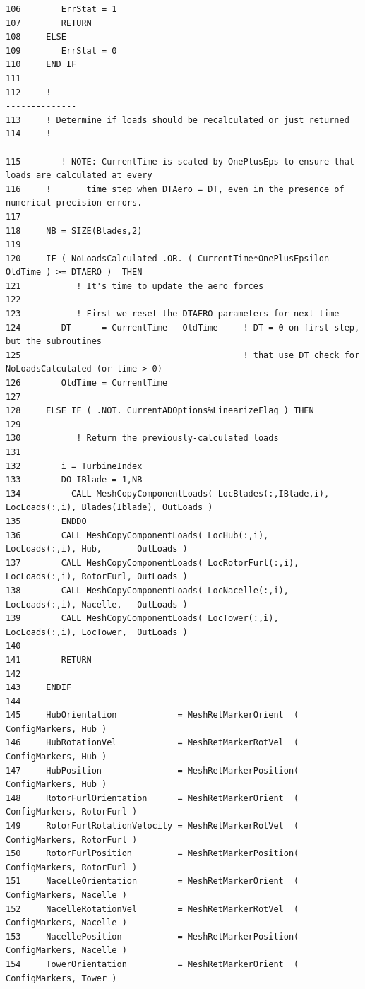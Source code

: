 \documentclass[11pt]{article}
\begin{document}
{\begin{verbatim}
106        ErrStat = 1
107        RETURN
108     ELSE
109        ErrStat = 0
110     END IF
111  
112     !---------------------------------------------------------------------------
113     ! Determine if loads should be recalculated or just returned
114     !---------------------------------------------------------------------------
115        ! NOTE: CurrentTime is scaled by OnePlusEps to ensure that loads are calculated at every
116     !       time step when DTAero = DT, even in the presence of numerical precision errors.
117  
118     NB = SIZE(Blades,2)
119  
120     IF ( NoLoadsCalculated .OR. ( CurrentTime*OnePlusEpsilon - OldTime ) >= DTAERO )  THEN
121           ! It's time to update the aero forces
122  
123           ! First we reset the DTAERO parameters for next time
124        DT      = CurrentTime - OldTime     ! DT = 0 on first step, but the subroutines 
125                                            ! that use DT check for NoLoadsCalculated (or time > 0)
126        OldTime = CurrentTime
127  
128     ELSE IF ( .NOT. CurrentADOptions%LinearizeFlag ) THEN
129  
130           ! Return the previously-calculated loads
131       
132        i = TurbineIndex
133        DO IBlade = 1,NB
134          CALL MeshCopyComponentLoads( LocBlades(:,IBlade,i), LocLoads(:,i), Blades(Iblade), OutLoads )
135        ENDDO
136        CALL MeshCopyComponentLoads( LocHub(:,i),       LocLoads(:,i), Hub,       OutLoads )
137        CALL MeshCopyComponentLoads( LocRotorFurl(:,i), LocLoads(:,i), RotorFurl, OutLoads )
138        CALL MeshCopyComponentLoads( LocNacelle(:,i),   LocLoads(:,i), Nacelle,   OutLoads )
139        CALL MeshCopyComponentLoads( LocTower(:,i),     LocLoads(:,i), LocTower,  OutLoads )
140  
141        RETURN
142  
143     ENDIF
144  
145     HubOrientation            = MeshRetMarkerOrient  ( ConfigMarkers, Hub )
146     HubRotationVel            = MeshRetMarkerRotVel  ( ConfigMarkers, Hub )
147     HubPosition               = MeshRetMarkerPosition( ConfigMarkers, Hub )
148     RotorFurlOrientation      = MeshRetMarkerOrient  ( ConfigMarkers, RotorFurl )
149     RotorFurlRotationVelocity = MeshRetMarkerRotVel  ( ConfigMarkers, RotorFurl )
150     RotorFurlPosition         = MeshRetMarkerPosition( ConfigMarkers, RotorFurl )
151     NacelleOrientation        = MeshRetMarkerOrient  ( ConfigMarkers, Nacelle )
152     NacelleRotationVel        = MeshRetMarkerRotVel  ( ConfigMarkers, Nacelle )
153     NacellePosition           = MeshRetMarkerPosition( ConfigMarkers, Nacelle )
154     TowerOrientation          = MeshRetMarkerOrient  ( ConfigMarkers, Tower )

\end{verbatim}}
\end{document}
